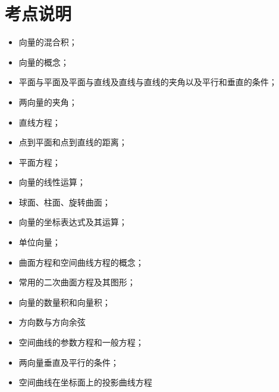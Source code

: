 \section{考点说明}
\begin{itemize}
\item 向量的混合积；
\item 向量的概念；
\item 平面与平面及平面与直线及直线与直线的夹角以及平行和垂直的条件；
\item 两向量的夹角；
\item 直线方程；
\item 点到平面和点到直线的距离；
\item 平面方程；
\item 向量的线性运算；
\item 球面、柱面、旋转曲面；
\item 向量的坐标表达式及其运算；
\item 单位向量；
\item 曲面方程和空间曲线方程的概念；
\item 常用的二次曲面方程及其图形；
\item 向量的数量积和向量积；
\item 方向数与方向余弦
\item 空间曲线的参数方程和一般方程；
\item 两向量垂直及平行的条件；
\item 空间曲线在坐标面上的投影曲线方程
\end{itemize}


